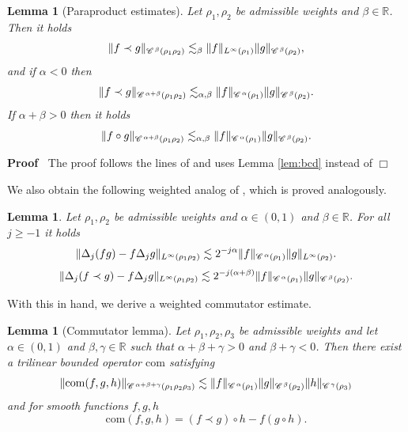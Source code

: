 \documentclass[a4paper,11pt]{article}
\renewcommand{\geq}{\geqslant}
\newenvironment{proof}{\noindent\textbf{Proof\ }}{\hspace*{\fill}$\Box$\medskip}
\newtheorem{lemma}[theorem]{Lemma}
\numberwithin{equation}{section}
\newcommand{\CC}{\mathscr{C} \hspace{.1em}}
\newcommand{\R}{\mathbb{R}}
\newcommand{\8}{\infty}
\begin{document}
\begin{lemma}[Paraproduct estimates]\label{lem:para}
Let $\rho_{1},\rho_{2}$ be admissible weights  and $\beta\in\R$. Then  it holds
\begin{equation*}%
\|f\prec g\|_{\CC^\beta(\rho_{1}\rho_{2})}\lesssim_\beta\|f\|_{L^\infty(\rho_{1})}\|g\|_{\CC^{\beta}(\rho_{2})},
\end{equation*}
and if $\alpha<0$ then
\begin{equation*}%
\|f\prec g\|_{\CC^{\alpha+\beta}(\rho_{1}\rho_{2})}\lesssim_{\alpha,\beta}\|f\|_{\CC^{\alpha}(\rho_{1})}\|g\|_{\CC^{\beta}(\rho_{2})}.
\end{equation*}
If  $\alpha+\beta>0$ then it holds
\begin{equation*}%
\|f\circ g\|_{\CC^{\alpha+\beta}(\rho_{1}\rho_{2})}\lesssim_{\alpha,\beta}\|f\|_{\CC^{\alpha}(\rho_{1})}\|g\|_{\CC^{\beta}(\rho_{2})}.
\end{equation*}
\end{lemma}

\begin{proof}
The proof follows the lines of \cite[Lemma 2.1]{GIP} and uses  Lemma \ref{lem:bcd} instead of \cite[Lemma A.3]{GIP}
\end{proof}

We also obtain the following weighted analog of \cite[Lemma 2.2, Lemma 2.3]{GIP}, which is proved analogously.


\begin{lemma}\label{lem:2.2}
Let $\rho_{1},\rho_{2}$ be admissible weights   and $\alpha\in(0,1)$ and $\beta\in\R$. For all $j\geq -1$ it holds
$$
\|\Delta_j(fg)-f\Delta_jg\|_{L^\infty(\rho_{1}\rho_{2})}\lesssim 2^{-j\alpha}\|f\|_{\CC^{\alpha}(\rho_{1})}\|g\|_{L^\infty(\rho_{2})}.
$$
$$
\|\Delta_j(f\prec g)-f\Delta_j g\|_{L^\infty(\rho_{1}\rho_{2})}\lesssim 2^{-j(\alpha+\beta)}\|f\|_{\CC^\alpha(\rho_{1})}\|g\|_{\CC^\beta(\rho_{2})}.
$$
\end{lemma}

With this in hand, we derive a weighted commutator estimate.

\begin{lemma}[Commutator lemma]\label{lem:com}
Let $\rho_{1}, \rho_{2}, \rho_{3}$ be admissible weights and let $\alpha\in (0,1)$ and $\beta,\gamma\in \R$ such that $\alpha+\beta+\gamma>0$ and $\beta+\gamma<0$. Then there exist a trilinear bounded operator $\mathrm{com}$ satisfying
$$
\|\mathrm{com}(f,g,h)\|_{\CC^{\alpha+\beta+\gamma}(\rho_{1}\rho_{2}\rho_{3})}\lesssim \|f\|_{\CC^\alpha(\rho_{1})}\|g\|_{\CC^\beta(\rho_{2})}\|h\|_{\CC^\gamma(\rho_{3})}
$$
and for smooth functions $f,g,h$
$$
\mathrm{com}(f,g,h)=(f\prec g)\circ h - f(g\circ h).
$$
\end{lemma}
\end{document}

